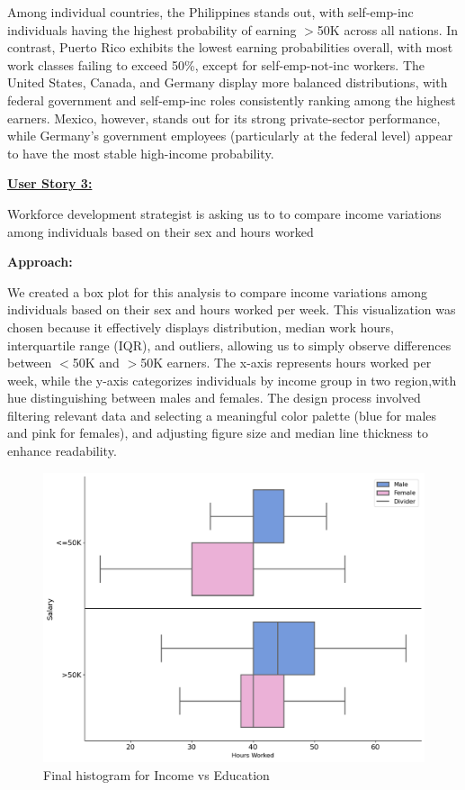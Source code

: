 \documentclass[journal,onecolumn]{IEEEtran}
\begin{document}
Among individual countries, the Philippines stands out, with self-emp-inc
individuals having the highest probability of earning $>$50K across all nations.
In contrast, Puerto Rico exhibits the lowest earning probabilities overall,
with most work classes failing to exceed 50\%, except for self-emp-not-inc workers.
The United States, Canada, and Germany display more balanced distributions,
with federal government and self-emp-inc roles consistently ranking among
the highest earners. Mexico, however, stands out for its strong
private-sector performance, while Germany’s government employees (particularly at the federal level)
appear to have the most stable high-income probability.

\underline{\textbf{User Story 3:} }

Workforce development strategist is asking us to to 
compare income variations among individuals based on their sex and hours worked

\textbf{Approach:} 

We created a box plot for this analysis to compare 
income variations among individuals based on their sex and hours worked per week.
This visualization was chosen because it effectively displays distribution,
median work hours, interquartile range (IQR), and outliers, allowing us
to simply observe differences between $<$50K and $>$50K earners. The x-axis
represents hours worked per week, while the y-axis categorizes individuals by income group
in two region,with hue distinguishing between males and females.
The design process involved filtering relevant data and selecting a meaningful
color palette (blue for males and pink for females), and adjusting figure size
and median line thickness to enhance readability.

\begin{figure}[h]
    \centering
    \includegraphics[width=1\linewidth]{gender_hours.png}  %
    \caption{Final histogram for Income vs Education}
    \label{fig:final_income_vs_education}
\end{figure}
\end{document}

